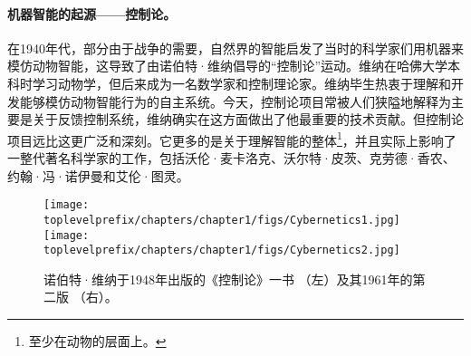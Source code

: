 \documentclass[../../book-main.tex]{subfiles}
\begin{document}



\paragraph{机器智能的起源——控制论。}
在1940年代，部分由于战争的需要，自然界的智能启发了当时的科学家们用机器来模仿动物智能，这导致了由诺伯特·维纳倡导的“控制论”运动。维纳在哈佛大学本科时学习动物学，但后来成为一名数学家和控制理论家。维纳毕生热衷于理解和开发能够模仿动物智能行为的自主系统。今天，控制论项目常被人们狭隘地解释为主要是关于反馈控制系统，维纳确实在这方面做出了他最重要的技术贡献。但控制论项目远比这更广泛和深刻。它更多的是关于理解智能的整体\footnote{至少在动物的层面上。}，并且实际上影响了一整代著名科学家的工作，包括沃伦·麦卡洛克、沃尔特·皮茨、克劳德·香农、约翰·冯·诺伊曼和艾伦·图灵。

\begin{figure}
    \centering
    \texttt{[image: \\toplevelprefix/chapters/chapter1/figs/Cybernetics1.jpg]}
    \hspace{10mm} \texttt{[image: \\toplevelprefix/chapters/chapter1/figs/Cybernetics2.jpg]}
    \caption{诺伯特·维纳于1948年出版的《控制论》一书 \cite{Wiener-Cybernetics-1948}（左）及其1961年的第二版 \cite{Wiener-Cybernetics-1961}（右）。}
    \label{fig:cybernetcis}
\end{figure}
\end{document}

